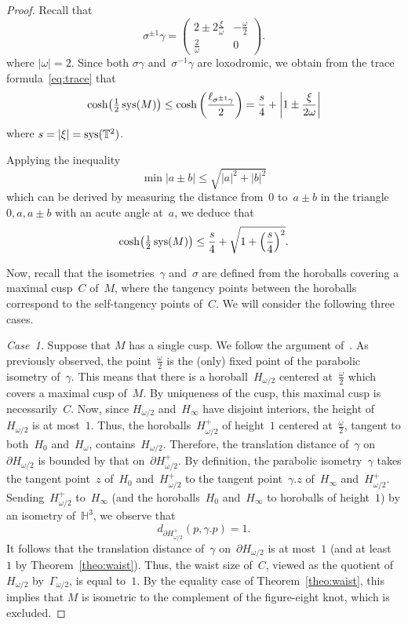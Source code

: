 \documentclass[11pt,reqno]{amsart}
\theoremstyle{definition}
\numberwithin{equation}{section}
\newcommand\T {{\mathbb T}}
\newcommand{\HH}{{\mathbb H}}
\DeclareMathOperator{\sys}{{\rm sys}}
\numberwithin{equation}{section}
\begin{document}
\begin{proof}
Recall that
\[
\sigma^{\pm 1} \gamma = 
\begin{pmatrix}
2 \pm 2 \frac{\xi}{\omega} & -\frac{\omega}{2} \\
\frac{2}{\omega} & 0
\end{pmatrix}.
\]
where $|\omega|=2$.
Since both $\sigma \gamma$ and~$\sigma^{-1} \gamma$ are loxodromic, we obtain from the trace formula~\eqref{eq:trace} that
\[
\cosh \!\left(\tfrac{1}{2} \sys(M) \right) \leq \cosh \left( \frac{\ell_{\sigma^{\pm 1} \gamma}}{2} \right) = \frac{s}{4} +\left| 1 \pm \frac{\xi}{2\omega} \right|
\]
where $s=|\xi|=\sys(\T^2)$.

Applying the inequality
\[
\min |a \pm b| \leq \sqrt{|a|^2+|b|^2}
\]
which can be derived by measuring the distance from~$0$ to~$a \pm b$ in the triangle $0,a,a \pm b$ with an acute angle at~$a$, we deduce that
\begin{equation} \label{eq:s/4}
\cosh \!\left(\tfrac{1}{2} \sys(M) \right) \leq \frac{s}{4} + \sqrt{1+\left( \frac{s}{4} \right)^2}.
\end{equation}

Now, recall that the isometries~$\gamma$ and~$\sigma$ are defined from the horoballs covering a maximal cusp~$C$ of~$M$, where the tangency points between the horoballs correspond to the self-tangency points of~$C$.
We will consider the following three cases.

\medskip

\emph{Case~1.} 
Suppose that $M$ has a single cusp.
We follow the argument of~\cite[Proposition~5.4]{gen}.
As previously observed, the point~$\frac{\omega}{2}$ is the (only) fixed point of the parabolic isometry of~$\gamma$.
This means that there is a horoball~$H_{\omega/2}$ centered at~$\frac{\omega}{2}$ which covers a maximal cusp of~$M$.
By uniqueness of the cusp, this maximal cusp is necessarily~$C$.
Now, since $H_{\omega/2}$ and~$H_\infty$ have disjoint interiors, the height of~$H_{\omega/2}$ is at most~$1$.
Thus, the horoballs~$H^+_{\omega/2}$ of height~$1$ centered at~$\frac{\omega}{2}$, tangent to both~$H_0$ and~$H_\omega$, contains~$H_{\omega/2}$.
Therefore, the translation distance of~$\gamma$ on~$\partial H_{\omega/2}$ is bounded by that on~$\partial H^+_{\omega/2}$.
By definition, the parabolic isometry~$\gamma$ takes the tangent point~$z$ of~$H_0$ and~$H^+_{\omega/2}$ to the tangent point~$\gamma. z$ of~$H_\infty$ and~$H^+_{\omega/2}$.
Sending~$H^+_{\omega/2}$ to~$H_\infty$ (and the horoballs~$H_0$ and~$H_\infty$ to horoballs of height~$1$) by an isometry of~$\HH^3$, we observe that 
\[
d_{\partial H^+_{\omega/2}}(p,\gamma.p) = 1.
\]
It follows that the translation distance of~$\gamma$ on~$\partial H_{\omega/2}$ is at most~$1$ (and at least~$1$ by Theorem~\ref{theo:waist}).
Thus, the waist size of~$C$, viewed as the quotient of~$H_{\omega/2}$ by~$\Gamma_{\omega/2}$, is equal to~$1$.
By the equality case of Theorem~\ref{theo:waist}, this implies that $M$ is isometric to the complement of the figure-eight knot, which is excluded.


\end{proof}
\end{document}
